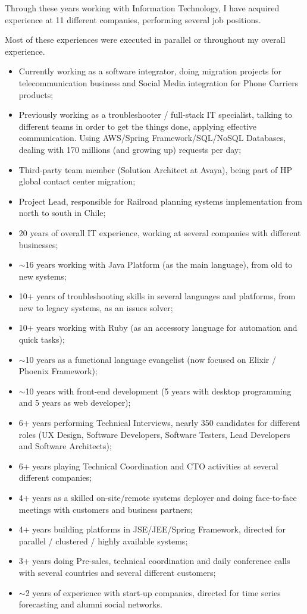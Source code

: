 
\begin{cvparagraph}
Through these years working with Information Technology, I have acquired experience at 11 different companies, performing several job positions.

Most of these experiences were executed in parallel or throughout my overall experience.

\begin{itemize}
\item Currently working as a software integrator, doing migration projects for telecommunication business and Social Media integration for Phone Carriers products;
\item Previously working as a troubleshooter / full-stack IT specialist, talking to different teams in order to get the things done, applying effective communication. Using AWS/Spring Framework/SQL/NoSQL Databases, dealing with 170 millions (and growing up) requests per day;
\item Third-party team member (Solution Architect at Avaya), being part of HP global contact center migration;
\item Project Lead, responsible for Railroad planning systems implementation from north to south in Chile;
\item 20 years of overall IT experience, working at several companies with different businesses;
\item $\sim$16 years working with Java Platform (as the main language), from old to new systems;
\item 10+ years of troubleshooting skills in several languages and platforms, from new to legacy systems, as an issues solver;
\item 10+ years working with Ruby  (as an accessory language for automation and quick tasks);
\item $\sim$10 years as a functional language evangelist (now focused on Elixir / Phoenix Framework);
\item $\sim$10 years with front-end development (5 years with desktop programming and 5 years as web developer);
\item 6+ years performing Technical Interviews, nearly 350 candidates for different roles (UX Design, Software Developers, Software Testers, Lead Developers and Software Architects);
\item 6+ years playing Technical Coordination and CTO activities at several different companies;
\item 4+ years as a skilled on-site/remote systems deployer and doing face-to-face meetings with customers and business partners;
\item 4+ years building platforms in JSE/JEE/Spring Framework, directed for parallel / clustered / highly available systems;
\item 3+ years doing Pre-sales, technical coordination and daily conference calls with several countries and several different customers;
\item $\sim$2 years of experience with start-up companies, directed for time series forecasting and alumni social networks.
\end{itemize}
\end{cvparagraph}
